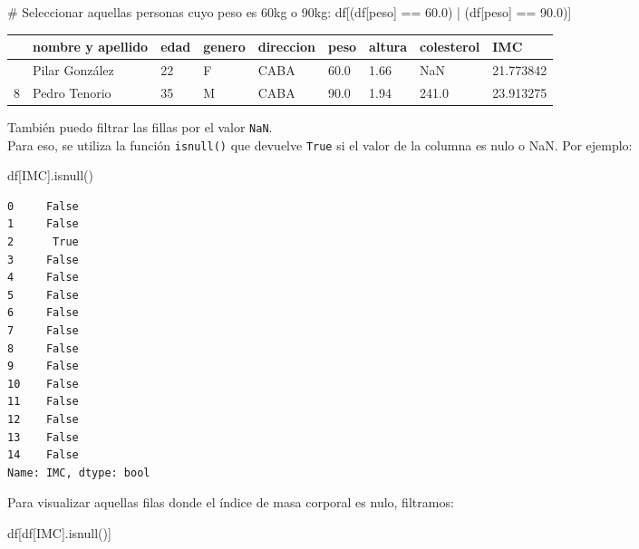 \documentclass[
  letterpaper,
  DIV=11,
  numbers=noendperiod]{scrreprt}
\newenvironment{Shaded}{\begin{snugshade}}{\end{snugshade}}
\newcommand{\CommentTok}[1]{\textcolor[rgb]{0.37,0.37,0.37}{#1}}
\newcommand{\FloatTok}[1]{\textcolor[rgb]{0.68,0.00,0.00}{#1}}
\newcommand{\NormalTok}[1]{\textcolor[rgb]{0.00,0.23,0.31}{#1}}
\newcommand{\OperatorTok}[1]{\textcolor[rgb]{0.37,0.37,0.37}{#1}}
\newcommand{\StringTok}[1]{\textcolor[rgb]{0.13,0.47,0.30}{#1}}
\begin{document}
\begin{Shaded}
\begin{Highlighting}[]
\CommentTok{\# Seleccionar aquellas personas cuyo peso es 60kg o 90kg:}
\NormalTok{df[(df[}\StringTok{\textquotesingle{}peso\textquotesingle{}}\NormalTok{] }\OperatorTok{==} \FloatTok{60.0}\NormalTok{) }\OperatorTok{|}\NormalTok{ (df[}\StringTok{\textquotesingle{}peso\textquotesingle{}}\NormalTok{] }\OperatorTok{==} \FloatTok{90.0}\NormalTok{)]}
\end{Highlighting}
\end{Shaded}

\begin{longtable}[]{@{}lllllllll@{}}
\toprule\noalign{}
& nombre y apellido & edad & genero & direccion & peso & altura &
colesterol & IMC \\
\midrule\noalign{}
\endhead
\bottomrule\noalign{}
\endlastfoot
7 & Pilar González & 22 & F & CABA & 60.0 & 1.66 & NaN & 21.773842 \\
8 & Pedro Tenorio & 35 & M & CABA & 90.0 & 1.94 & 241.0 & 23.913275 \\
\end{longtable}

También puedo filtrar las fillas por el valor \texttt{NaN}.\\
Para eso, se utiliza la función \texttt{isnull()} que devuelve
\texttt{True} si el valor de la columna es nulo o NaN. Por ejemplo:

\begin{Shaded}
\begin{Highlighting}[]
\NormalTok{df[}\StringTok{\textquotesingle{}IMC\textquotesingle{}}\NormalTok{].isnull()}
\end{Highlighting}
\end{Shaded}

\begin{verbatim}
0     False
1     False
2      True
3     False
4     False
5     False
6     False
7     False
8     False
9     False
10    False
11    False
12    False
13    False
14    False
Name: IMC, dtype: bool
\end{verbatim}

Para visualizar aquellas filas donde el índice de masa corporal es nulo,
filtramos:

\begin{Shaded}
\begin{Highlighting}[]
\NormalTok{df[df[}\StringTok{\textquotesingle{}IMC\textquotesingle{}}\NormalTok{].isnull()]}
\end{Highlighting}
\end{Shaded}
\end{document}
